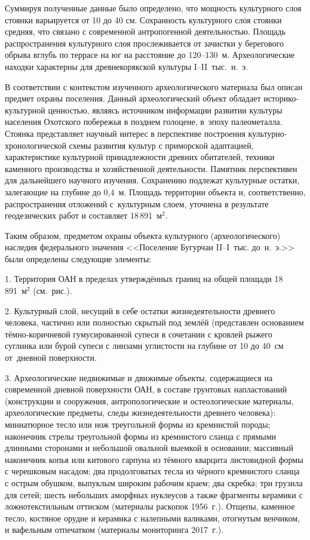 Суммируя полученные данные было определено, что мощность культурного слоя стоянки варьируется от 10 до 40 см. Сохранность культурного слоя стоянки средняя, что связано с современной антропогенной деятельностью. Площадь распространения культурного слоя прослеживается от зачистки у берегового обрыва вглубь по террасе на юг на расстояние до 120--130~м. Археологические находки характерны для древнекорякской культуры I--II~тыс.~н.~э.

В соответствии с контекстом изученного археологического материала был описан предмет охраны поселения. Данный археологический объект обладает историко-культурной ценностью, являясь источником информации развитии культуры населения Охотского побережья в позднем голоцене, в~эпоху палеометалла. Стоянка представляет научный интерес в перспективе построения культурно-хронологической схемы развития культур с приморской адаптацией, характеристике культурной принадлежности древних обитателей, техники каменного производства и хозяйственной деятельности. Памятник перспективен для дальнейшего научного изучения. Сохранению подлежат культурные остатки, залегающие на глубине до 0,4~м. Площадь территории объекта и, соответственно, распространения отложений с~культурным слоем, уточнена в результате геодезических работ и составляет 18\,891~м$^2$.

Таким образом, предметом охраны объекта культурного (археологического) наследия федерального значения <<Поселение Бугурчан II--I~тыс. до~н.~э.>> были определены следующие элементы:

1. Территория ОАН в пределах утверждённых границ на общей площади  18\,891~м$^2$ (см.~рис.).



2. Культурный слой, несущий в себе остатки жизнедеятельности древнего человека, частично или полностью скрытый под землёй (представлен основанием тёмно-коричневой гумусированной супеси в сочетании с кровлей рыжего суглинка или бурой супеси с линзами углистости на глубине от 10 до 40~см от~дневной поверхности.

3. Археологические недвижимые и движимые объекты, содержащиеся на современной дневной поверхности ОАН, в составе грунтовых напластований (конструкции и сооружения, антропологические и остеологические материалы, археологические предметы, следы жизнедеятельности древнего человека): миниатюрное тесло или нож треугольной формы из кремнистой породы; наконечник стрелы треугольной формы из кремнистого сланца с прямыми длинными сто­ронами и небольшой овальной выемкой в основании; массивный наконечник копья или китового гарпуна из тёмного кварцита листовидной формы с черешковым насадом; два продолговатых тесла из чёрного кремнистого сланца с острым обушком, выпуклым широким рабочим краем; два скребка; три грузила для сетей; шесть небольших аморфных нуклеусов а также фрагменты керамики с ложнотекстильным оттиском (материалы раскопок 1956~г.). Отщепы, каменное тесло, костяное орудие и керамика с налепными валиками, отогнутым венчиком, и вафельным отпечатком (материалы мониторинга 2017~г.).


